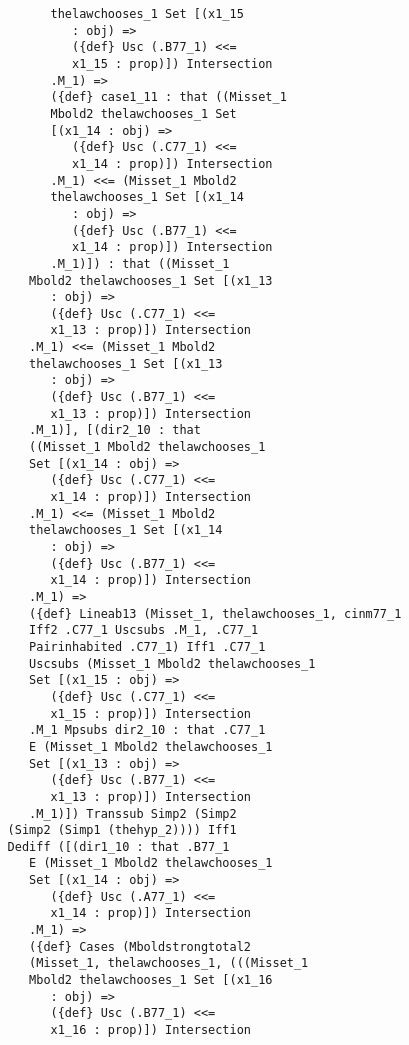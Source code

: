 \documentclass[12pt]{article}
\begin{document}
\begin{verbatim}
                thelawchooses_1 Set [(x1_15 
                   : obj) => 
                   ({def} Usc (.B77_1) <<= 
                   x1_15 : prop)]) Intersection 
                .M_1) => 
                ({def} case1_11 : that ((Misset_1 
                Mbold2 thelawchooses_1 Set 
                [(x1_14 : obj) => 
                   ({def} Usc (.C77_1) <<= 
                   x1_14 : prop)]) Intersection 
                .M_1) <<= (Misset_1 Mbold2 
                thelawchooses_1 Set [(x1_14 
                   : obj) => 
                   ({def} Usc (.B77_1) <<= 
                   x1_14 : prop)]) Intersection 
                .M_1)]) : that ((Misset_1 
             Mbold2 thelawchooses_1 Set [(x1_13 
                : obj) => 
                ({def} Usc (.C77_1) <<= 
                x1_13 : prop)]) Intersection 
             .M_1) <<= (Misset_1 Mbold2 
             thelawchooses_1 Set [(x1_13 
                : obj) => 
                ({def} Usc (.B77_1) <<= 
                x1_13 : prop)]) Intersection 
             .M_1)], [(dir2_10 : that 
             ((Misset_1 Mbold2 thelawchooses_1 
             Set [(x1_14 : obj) => 
                ({def} Usc (.C77_1) <<= 
                x1_14 : prop)]) Intersection 
             .M_1) <<= (Misset_1 Mbold2 
             thelawchooses_1 Set [(x1_14 
                : obj) => 
                ({def} Usc (.B77_1) <<= 
                x1_14 : prop)]) Intersection 
             .M_1) => 
             ({def} Lineab13 (Misset_1, thelawchooses_1, cinm77_1 
             Iff2 .C77_1 Uscsubs .M_1, .C77_1 
             Pairinhabited .C77_1) Iff1 .C77_1 
             Uscsubs (Misset_1 Mbold2 thelawchooses_1 
             Set [(x1_15 : obj) => 
                ({def} Usc (.C77_1) <<= 
                x1_15 : prop)]) Intersection 
             .M_1 Mpsubs dir2_10 : that .C77_1 
             E (Misset_1 Mbold2 thelawchooses_1 
             Set [(x1_13 : obj) => 
                ({def} Usc (.B77_1) <<= 
                x1_13 : prop)]) Intersection 
             .M_1)]) Transsub Simp2 (Simp2 
          (Simp2 (Simp1 (thehyp_2)))) Iff1 
          Dediff ([(dir1_10 : that .B77_1 
             E (Misset_1 Mbold2 thelawchooses_1 
             Set [(x1_14 : obj) => 
                ({def} Usc (.A77_1) <<= 
                x1_14 : prop)]) Intersection 
             .M_1) => 
             ({def} Cases (Mboldstrongtotal2 
             (Misset_1, thelawchooses_1, (((Misset_1 
             Mbold2 thelawchooses_1 Set [(x1_16 
                : obj) => 
                ({def} Usc (.B77_1) <<= 
                x1_16 : prop)]) Intersection 

\end{verbatim}
\end{document}
